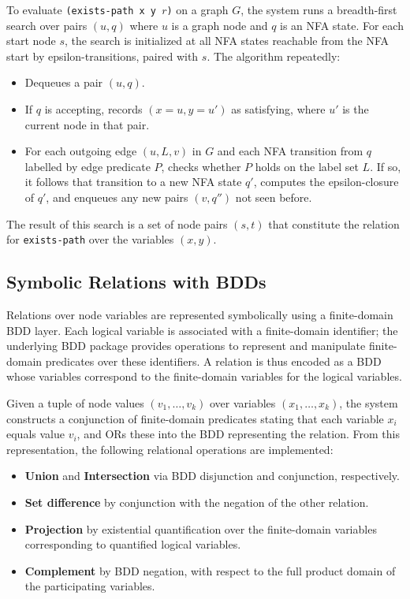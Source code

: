 \documentclass[11pt]{article}
\begin{document}
To evaluate \texttt{(exists-path x y $r$)} on a graph $G$, the system runs a breadth-first search over pairs $(u,q)$ where $u$ is a graph node and $q$ is an NFA state. For each start node $s$, the search is initialized at all NFA states reachable from the NFA start by epsilon-transitions, paired with $s$. The algorithm repeatedly:
\begin{itemize}[leftmargin=*]
  \item Dequeues a pair $(u,q)$.
  \item If $q$ is accepting, records $(x=u,y=u')$ as satisfying, where $u'$ is the current node in that pair.
  \item For each outgoing edge $(u,L,v)$ in $G$ and each NFA transition from $q$ labelled by edge predicate $P$, checks whether $P$ holds on the label set $L$. If so, it follows that transition to a new NFA state $q'$, computes the epsilon-closure of $q'$, and enqueues any new pairs $(v,q'')$ not seen before.
\end{itemize}

The result of this search is a set of node pairs $(s,t)$ that constitute the relation for \texttt{exists-path} over the variables $(x,y)$.

\subsection*{Symbolic Relations with BDDs}

Relations over node variables are represented symbolically using a finite-domain BDD layer. Each logical variable is associated with a finite-domain identifier; the underlying BDD package provides operations to represent and manipulate finite-domain predicates over these identifiers. A relation is thus encoded as a BDD whose variables correspond to the finite-domain variables for the logical variables.

Given a tuple of node values $(v_1,\dots,v_k)$ over variables $(x_1,\dots,x_k)$, the system constructs a conjunction of finite-domain predicates stating that each variable $x_i$ equals value $v_i$, and ORs these into the BDD representing the relation. From this representation, the following relational operations are implemented:
\begin{itemize}[leftmargin=*]
  \item \textbf{Union} and \textbf{Intersection} via BDD disjunction and conjunction, respectively.
  \item \textbf{Set difference} by conjunction with the negation of the other relation.
  \item \textbf{Projection} by existential quantification over the finite-domain variables corresponding to quantified logical variables.
  \item \textbf{Complement} by BDD negation, with respect to the full product domain of the participating variables.
\end{itemize}
\end{document}
